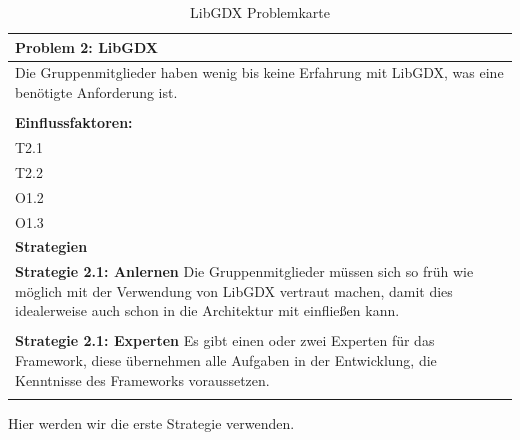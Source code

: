 \documentclass[fontsize=12pt,paper=a4,twoside]{scrartcl}
\begin{document}
\begin{table}[H]
    \centering
    \begin{tabular}{|p{15cm}|}
    \hline
          \textbf{Problem 2:} LibGDX \\ \hline
	Die Gruppenmitglieder haben wenig bis keine Erfahrung mit LibGDX, was eine benötigte Anforderung ist. \\
         \\ \hline
          \textbf{Einflussfaktoren: } \\
	T2.1 \\
	T2.2 \\
	O1.2 \\
	O1.3 \\
          \hline
          \textbf{Strategien} \\ \hline
            {}          
           \label{strategie:2.1}     
          \textbf{Strategie 2.1: Anlernen} Die Gruppenmitglieder müssen sich so früh wie möglich mit der Verwendung von LibGDX vertraut machen, damit dies idealerweise auch schon in die Architektur mit einfließen kann.  \\        
	 \\ \hline
	 {}          
           \label{strategie:2.2}     
          \textbf{Strategie 2.1: Experten} Es gibt einen oder zwei Experten für das Framework, diese übernehmen alle Aufgaben in der Entwicklung, die Kenntnisse des Frameworks voraussetzen.\\        
	 \\ \hline
    \end{tabular}

    \caption{LibGDX Problemkarte}
    \label{tab:ProblemKarte2}
\end{table}
Hier werden wir die erste Strategie verwenden. \\
\end{document}
